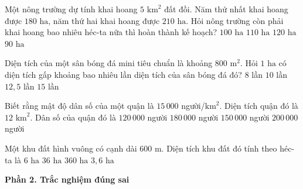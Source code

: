 \begin{ex} %
Một nông trường dự tính khai hoang $5\text{ km}^2$ đất đồi. Năm thứ nhất khai hoang được $180\text{ ha}$, năm thứ hai khai hoang được $210\text{ ha}$. Hỏi nông trường còn phải khai hoang bao nhiêu héc-ta nữa thì hoàn thành kế hoạch?
\choice
{$100\text{ ha}$}
{\True $110\text{ ha}$}
{$120\text{ ha}$}
{$90\text{ ha}$}
\end{ex}

\begin{ex} %
Diện tích của một sân bóng đá mini tiêu chuẩn là khoảng $800\text{ m}^2$. Hỏi $1\text{ ha}$ có diện tích gấp khoảng bao nhiêu lần diện tích của sân bóng đá đó?
\choice
{$8$ lần}
{$10$ lần}
{\True $12{,}5$ lần}
{$15$ lần}
\end{ex}

\begin{ex} %
Biết rằng mật độ dân số của một quận là $15\,000$ người/$\text{km}^2$. Diện tích quận đó là $12\text{ km}^2$. Dân số của quận đó là
\choice
{$120\,000$ người}
{\True $180\,000$ người}
{$150\,000$ người}
{$200\,000$ người}
\end{ex}

\begin{ex} %
Một khu đất hình vuông có cạnh dài $600\text{ m}$. Diện tích khu đất đó tính theo héc-ta là
\choice
{$6\text{ ha}$}
{\True $36\text{ ha}$}
{$360\text{ ha}$}
{$3{,}6\text{ ha}$}
\end{ex}

\textbf{Phần 2. Trắc nghiệm đúng sai}


